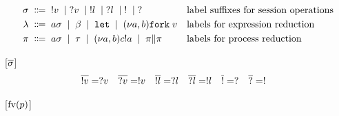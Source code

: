 \begin{align*}
  \sigma \; \Coloneqq \;\;&
    !v \; \mid \; ?v \; \mid \; !l \; \mid \; ?l \; \mid \; ! \; \mid \; ?
  && \text{label suffixes for session operations} \\
  \lambda \; \Coloneqq \;\;&
    a\sigma \; \mid \; \beta \; \mid \;  \mathtt{let} \; \mid \; (\nu a,b) \mathtt{fork}\; v
  &&\text{labels for expression reduction} \\
  \pi \; \Coloneqq \;\;&
               a\sigma \; \mid \; \tau \; \mid \; (\nu a,b) c!a
               \; \mid \; \pi \| \pi
  &&\text{labels for process reduction}
\end{align*}

[$\overline{\sigma}$]
\begin{align*}
  \overline{!v} &= ?v
  &\overline{ ?v} &= !v
  &\overline{ !l} &= ?l
  &\overline{ ?l} &= !l
  & \overline{!} &= ?
  &\overline{?} &= !
\end{align*}

[$\mathrm{fv}(p)$]

